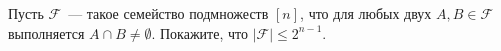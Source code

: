 Пусть $\mathcal{F}$~--- такое семейство подмножеств $[n]$, что для любых двух $A, B \in \mathcal{F}$ выполняется $A \cap B
\neq \emptyset$. Покажите, что $|\mathcal{F}| \le 2^{n - 1}$.